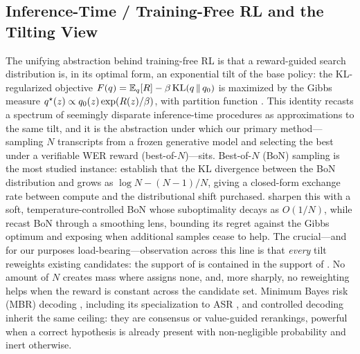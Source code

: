 \subsection{Inference-Time / Training-Free RL and the Tilting View}
\label{sec:rw-tilting}

The unifying abstraction behind training-free RL is that a reward-guided search distribution \qz is, in its optimal form, an exponential tilt of the base policy: the KL-regularized objective \(F\!\left(q\right)=\mathbb{E}_{q}[R]-\beta\,\mathrm{KL}\!\left(q \,\|\, q_{0}\right)\) is maximized by the Gibbs measure \(q^{\star}(z)\propto q_{0}(z)\exp(R(z)/\beta)\), with partition function \Zpart \citep{korbak2022kl}. This identity recasts a spectrum of seemingly disparate inference-time procedures as approximations to the same tilt, and it is the abstraction under which our primary method---sampling $N$ transcripts from a frozen generative model and selecting the best under a verifiable WER reward (best-of-$N$)---sits. Best-of-$N$ (BoN) sampling is the most studied instance: \citet{beirami2024bon} establish that the KL divergence between the BoN distribution and \qo grows as \(\log N - (N{-}1)/N\), giving a closed-form exchange rate between compute and the distributional shift purchased. \citet{verdun2025softbon} sharpen this with a soft, temperature-controlled BoN whose suboptimality decays as \(O(1/N)\), while \citet{aminian2025smoothing} recast BoN through a smoothing lens, bounding its regret against the Gibbs optimum and exposing when additional samples cease to help. The crucial---and for our purposes load-bearing---observation across this line is that \emph{every} tilt reweights existing candidates: the support of \qz is contained in the support of \qo. No amount of $N$ creates mass where \qo assigns none, and, more sharply, no reweighting helps when the reward is constant across the candidate set. Minimum Bayes risk (MBR) decoding \citep{ichihara2025mbr}, including its specialization to ASR \citep{mbrasr2025}, and controlled decoding \citep{mudgal2024controlled} inherit the same ceiling: they are consensus or value-guided rerankings, powerful when a correct hypothesis is already present with non-negligible probability and inert otherwise.

